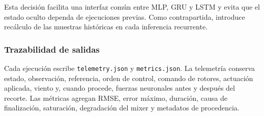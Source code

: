 Esta decisión facilita una interfaz común entre MLP, GRU y LSTM y evita
que el estado oculto dependa de ejecuciones previas. Como contrapartida,
introduce recálculo de las muestras históricas en cada inferencia recurrente.

\subsubsection*{Trazabilidad de salidas}

Cada ejecución escribe \texttt{telemetry.json} y \texttt{metrics.json}. La
telemetría conserva estado, observación, referencia, orden de control, comando
de rotores, actuación aplicada, viento y, cuando procede, fuerzas neuronales
antes y después del recorte. Las métricas agregan RMSE, error máximo, duración,
causa de finalización, saturación, degradación del mixer y metadatos de
procedencia.